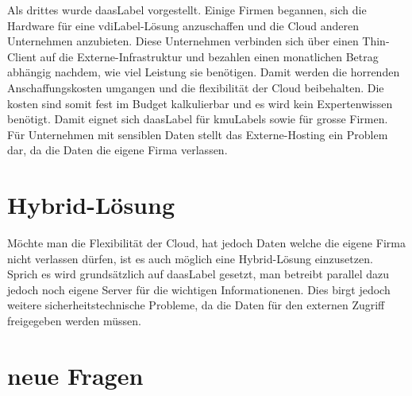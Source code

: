Als drittes wurde \Gls{daasLabel} vorgestellt. Einige Firmen begannen, sich die Hardware für eine \Gls{vdiLabel}-Lösung anzuschaffen und die Cloud anderen Unternehmen anzubieten. Diese Unternehmen verbinden sich über einen Thin-Client auf die Externe-Infrastruktur und bezahlen einen monatlichen Betrag abhängig nachdem, wie viel Leistung sie benötigen. Damit werden die horrenden Anschaffungskosten umgangen und die flexibilität der Cloud beibehalten. Die kosten sind somit fest im Budget kalkulierbar und es wird kein Expertenwissen benötigt. Damit eignet sich \Gls{daasLabel} für \Gls{kmuLabel}s sowie für grosse Firmen. Für Unternehmen mit sensiblen Daten stellt das Externe-Hosting ein Problem dar, da die Daten die eigene Firma verlassen.

\section{Hybrid-Lösung}
Möchte man die Flexibilität der Cloud, hat jedoch Daten welche die eigene Firma nicht verlassen dürfen, ist es auch möglich eine Hybrid-Lösung einzusetzen. Sprich es wird grundsätzlich auf \Gls{daasLabel} gesetzt, man betreibt parallel dazu jedoch noch eigene Server für die wichtigen Informationenen. Dies birgt jedoch weitere sicherheitstechnische Probleme, da die Daten für den externen Zugriff freigegeben werden müssen.

\section{neue Fragen}


\glsaddall
